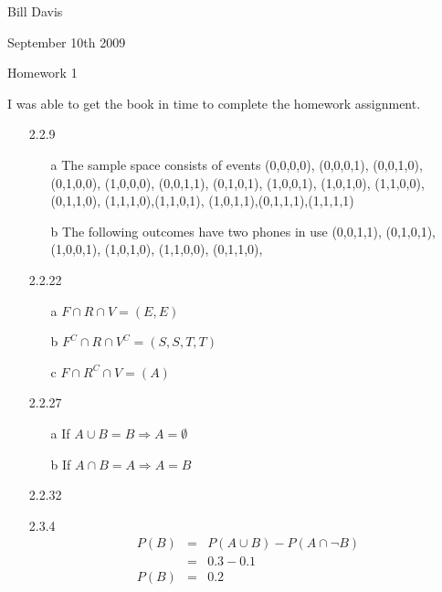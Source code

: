 \documentclass[11pt,fleqn]{article}
\begin{document}
\newcommand{\mbf}[1]{\mbox{{\bfseries #1}}}
\newcommand{\N}{\mbf{N}}
\renewcommand{\O}{\mbf{O}}

\noindent Bill Davis 

\noindent September 10th 2009 

\noindent Homework 1

I was able to get the book in time to complete the homework assignment. 



\begin{enumerate} 

\item[2.2.9] 
\begin{enumerate}
  \item[a] The sample space consists of events (0,0,0,0), (0,0,0,1), (0,0,1,0),
  (0,1,0,0), (1,0,0,0), (0,0,1,1), (0,1,0,1), (1,0,0,1), (1,0,1,0), (1,1,0,0),
  (0,1,1,0), (1,1,1,0),(1,1,0,1), (1,0,1,1),(0,1,1,1),(1,1,1,1)
  \item[b] The following outcomes have two phones in use (0,0,1,1), (0,1,0,1), 
  (1,0,0,1), (1,0,1,0), (1,1,0,0), (0,1,1,0),
\end{enumerate}
  
\item[2.2.22]
\begin{enumerate}
  \item[a] 
  	$F \cap R \cap V = (E, E)$
  \item[b] 
  	$F^{C} \cap R \cap V^{C} = (S,S,T,T)$
  \item[c] 
  	$F \cap R^{C} \cap V = (A)$
\end{enumerate}


\item[2.2.27]
\begin{enumerate}
  \item[a] If $A \cup B = B \Rightarrow A = \emptyset$
  \item[b] If $A \cap B = A \Rightarrow A = B$
\end{enumerate}



\item[2.2.32]
\vspace{100 mm}

\item[2.3.4]
\begin{eqnarray}
	P(B) &=& P(A \cup B) - P(A \cap \lnot B) \\
	     &=& 0.3 - 0.1 \\
	P(B) &=& 0.2 	
\end{eqnarray}


\end{enumerate}
\end{document}
